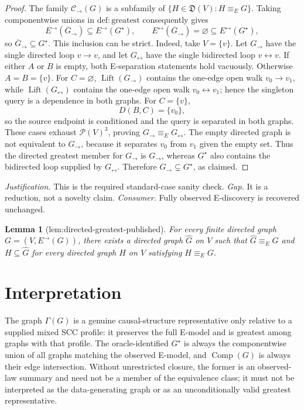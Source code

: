 \documentclass{article}
\newtheorem{lemma}{Lemma}
\begin{document}
\begin{proof}
The family \(\mathcal C_{\to}(G)\) is a subfamily of \(\{H\in\mathfrak D(V):H\equiv_EG\}\).  Taking componentwise unions in \(\mathrm{def{:}greatest}\) consequently gives
\[
 E^{\to}(\overline G_{\to})\subseteq E^{\to}(G^\star),
 \qquad
 E^{\leftrightarrow}(\overline G_{\to})=\varnothing
 \subseteq E^{\leftrightarrow}(G^\star),
\]
so \(\overline G_{\to}\subseteq G^\star\).  This inclusion can be strict.  Indeed, take \(V=\{v\}\).  Let \(G_{\to}\) have the single directed loop \(v\to v\), and let \(G_{\leftrightarrow}\) have the single bidirected loop \(v\leftrightarrow v\).  If either \(A\) or \(B\) is empty, both E-separation statements hold vacuously.  Otherwise \(A=B=\{v\}\).  For \(C=\varnothing\), \(\operatorname{Lift}(G_{\to})\) contains the one-edge open walk \(v_0\to v_1\), while \(\operatorname{Lift}(G_{\leftrightarrow})\) contains the one-edge open walk \(v_0\leftrightarrow v_1\); hence the singleton query is a dependence in both graphs.  For \(C=\{v\}\),
\[
 D(B,C)=\{v_0\},
\]
so the source endpoint is conditioned and the query is separated in both graphs.  These cases exhaust \(\mathcal P(V)^3\), proving \(G_{\to}\equiv_EG_{\leftrightarrow}\).  The empty directed graph is not equivalent to \(G_{\to}\), because it separates \(v_0\) from \(v_1\) given the empty set.  Thus the directed greatest member for \(G_{\to}\) is \(G_{\to}\), whereas \(G^\star\) also contains the bidirected loop supplied by \(G_{\leftrightarrow}\).  Therefore \(G_{\to}\subsetneq G^\star\), as claimed.
\end{proof}
\par\smallskip\noindent \textit{Justification.} This is the required standard-case sanity check. \textit{Gap.} It is a reduction, not a novelty claim. \textit{Consumer.} Fully observed E-discovery is recovered unchanged.

\begin{lemma}[lem:directed-greatest-published]\label{lem:directed-greatest-published}
For every finite directed graph \(G=(V,E^{\to}(G))\), there exists a directed graph \(\widehat G\) on \(V\) such that \(\widehat G\equiv_E G\) and \(H\subseteq\widehat G\) for every directed graph \(H\) on \(V\) satisfying \(H\equiv_EG\).
\end{lemma}

\section{Interpretation}

The graph \(\Gamma(G)\) is a genuine causal-structure representative only relative to a supplied mixed SCC profile: it preserves the full E-model and is greatest among graphs with that profile. The oracle-identified \(G^\star\) is always the componentwise union of all graphs matching the observed E-model, and \(\operatorname{Comp}(G)\) is always their edge intersection. Without unrestricted closure, the former is an observed-law summary and need not be a member of the equivalence class; it must not be interpreted as the data-generating graph or as an unconditionally valid greatest representative.
\end{document}
